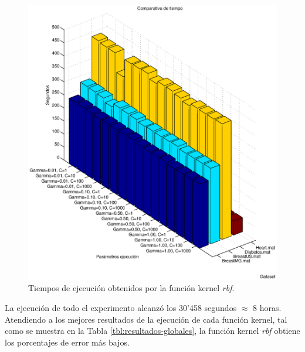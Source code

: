 \documentclass[spanish,12pt]{article}
\begin{document}
\begin{figure}
        \centering
        \includegraphics[width=\textwidth]{imagenes/rbf-time}
        \caption{Tiempos de ejecución obtenidos por la función kernel \emph{rbf}.}\label{fig:rbf-time}
\end{figure}

La ejecución de todo el experimento alcanzó los 30'458 segundos $\approx$ 8 horas.
Atendiendo a los mejores resultados de la ejecución de cada función kernel, tal como se muestra en la Tabla \ref{tbl:resultados-globales}, la función kernel \emph{rbf} obtiene los porcentajes de error más bajos.
\end{document}

